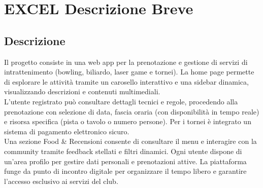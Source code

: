 \documentclass[a4paper, twoside]{report}
\begin{document}
\chapter{EXCEL Descrizione Breve}
\section{Descrizione}
Il progetto consiste in una web app per la prenotazione e gestione di servizi di intrattenimento (bowling, biliardo, laser game e tornei). La home page permette di esplorare le attività tramite un carosello interattivo e una sidebar dinamica, visualizzando descrizioni e contenuti multimediali.\\
L’utente registrato può consultare dettagli tecnici e regole, procedendo alla prenotazione con selezione di data, fascia oraria (con disponibilità in tempo reale) e risorsa specifica (pista o tavolo o numero persone). Per i tornei è integrato un sistema di pagamento elettronico sicuro.\\
Una sezione Food \& Recensioni consente di consultare il menu e interagire con la community tramite feedback stellati e filtri dinamici. Ogni utente dispone di un’area profilo per gestire dati personali e prenotazioni attive. La piattaforma funge da punto di incontro digitale per organizzare il tempo libero e garantire l’accesso esclusivo ai servizi del club.
\end{document}

